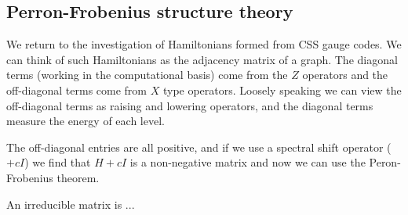 \documentclass[12pt]{article}
\begin{document}
\subsection{Perron-Frobenius structure theory}



We return to the investigation of Hamiltonians
formed from CSS gauge codes.
We can think of such Hamiltonians as the adjacency matrix of a graph.
The diagonal terms (working in the computational basis)
come from the $Z$ operators and the off-diagonal terms
come from $X$ type operators.
Loosely speaking we can view the off-diagonal terms as 
raising and lowering operators, and the diagonal
terms measure the energy of each level.

The off-diagonal entries are all positive, and
if we use a spectral shift operator ($+cI$) we
find that $H+cI$ is a non-negative matrix and
now we can use the Peron-Frobenius theorem.

An irreducible matrix is ... 
\end{document}

